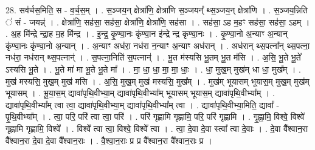 \documentclass[17pt]{extarticle}
\begin{document}
28. सव॑र्चस॒मिति॒ स - व॒र्च॒स॒म् । . स॒ञ्जय॒न् क्षेत्रा॑णि॒ क्षेत्रा॑णि स॒ञ्जयन्᳚ थ्स॒ञ्जय॒न् क्षेत्रा॑णि । . स॒ञ्जय॒न्निति ॑ सं - जयन्न्॑ । . क्षेत्रा॑णि॒ सह॑सा॒ सह॑सा॒ क्षेत्रा॑णि॒ क्षेत्रा॑णि॒ सह॑सा । . सह॑सा॒ ऽह म॒हꣳ सह॑सा॒ सह॑सा॒ ऽहम् । . अ॒ह मि॑न्द्रे न्द्रा॒ह म॒ह मि॑न्द्र । . इ॒न्द्र॒ कृ॒ण्वा॒नः कृ॑ण्वा॒न इ॑न्द्रे न्द्र कृण्वा॒नः । . कृ॒ण्वा॒नो अ॒न्याꣳ अ॒न्यान् कृ॑ण्वा॒नः कृ॑ण्वा॒नो अ॒न्यान् । . अ॒न्याꣳ अध॑रा॒ नध॑रा न॒न्याꣳ अ॒न्याꣳ अध॑रान् । . अध॑रान् थ्स॒पत्ना᳚न् थ्स॒पत्ना॒ नध॑रा॒ नध॑रान् थ्स॒पत्नान्॑ । . स॒पत्ना॒निति॑ स॒पत्नान्॑ । . भू॒त म॑स्यसि भू॒तम् भू॒त म॑सि । . अ॒सि॒ भू॒ते भू॒ते᳚ ऽस्यसि भू॒ते । . भू॒ते मा॑ मा भू॒ते भू॒ते मा᳚ । . मा॒ धा॒ धा॒ मा॒ मा॒ धाः॒ । . धा॒ मुख॒म् मुख॑म् धा धा॒ मुख᳚म् । . मुख॑ मस्यसि॒ मुख॒म् मुख॑ मसि । . अ॒सि॒ मुख॒म् मुख॑ मस्यसि॒ मुख᳚म् । . मुख॑म् भूयासम् भूयास॒म् मुख॒म् मुख॑म् भूयासम् । . भू॒या॒स॒म् द्यावा॑पृथि॒वीभ्या॒म् द्यावा॑पृथि॒वीभ्या᳚म् भूयासम् भूयास॒म् द्यावा॑पृथि॒वीभ्या᳚म् । . द्यावा॑पृथि॒वीभ्या᳚म् त्वा त्वा॒ द्यावा॑पृथि॒वीभ्या॒म् द्यावा॑पृथि॒वीभ्या᳚म् त्वा । . द्यावा॑पृथि॒वीभ्या॒मिति॒ द्यावा᳚ - पृ॒थि॒वीभ्या᳚म् । . त्वा॒ परि॒ परि॑ त्वा त्वा॒ परि॑ । . परि॑ गृह्णामि गृह्णामि॒ परि॒ परि॑ गृह्णामि । . गृ॒ह्णा॒मि॒ विश्वे॒ विश्वे॑ गृह्णामि गृह्णामि॒ विश्वे᳚ । . विश्वे᳚ त्वा त्वा॒ विश्वे॒ विश्वे᳚ त्वा । . त्वा॒ दे॒वा दे॒वा स्त्वा᳚ त्वा दे॒वाः । . दे॒वा वै᳚श्वान॒रा वै᳚श्वान॒रा दे॒वा दे॒वा वै᳚श्वान॒राः । . वै॒श्वा॒न॒राः प्र प्र वै᳚श्वान॒रा वै᳚श्वान॒राः प्र । \newline
\end{document}
